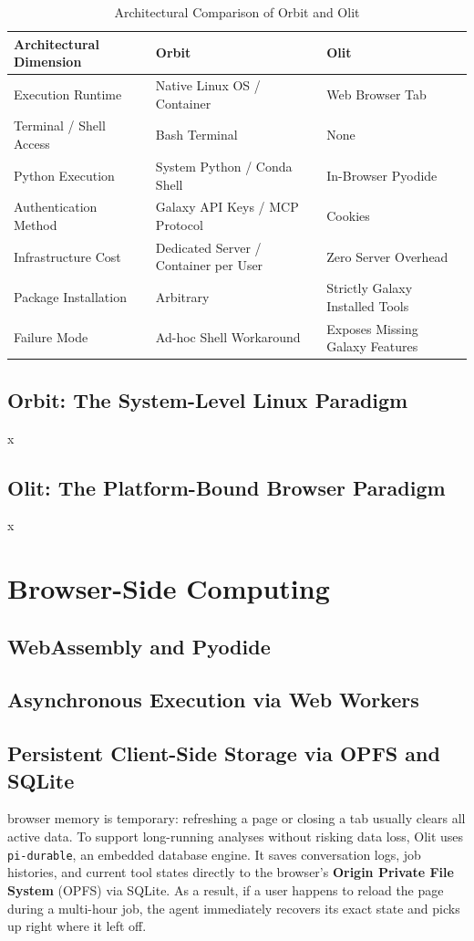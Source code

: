 \begin{table}[htbp]
\centering
\caption{Architectural Comparison of Orbit and Olit}
\label{tab:orbit_vs_olit}
\begin{tabular}{@{}lll@{}}
\toprule
\textbf{Architectural Dimension} & \textbf{Orbit} & \textbf{Olit} \\ \midrule
Execution Runtime & Native Linux OS / Container & Web Browser Tab \\
Terminal / Shell Access & Bash Terminal & None \\
Python Execution & System Python / Conda Shell & In-Browser Pyodide \\
Authentication Method & Galaxy API Keys / MCP Protocol & Cookies \\
Infrastructure Cost & Dedicated Server / Container per User & Zero Server Overhead \\
Package Installation & Arbitrary & Strictly Galaxy Installed Tools \\
Failure Mode & Ad-hoc Shell Workaround & Exposes Missing Galaxy Features \\ \bottomrule
\end{tabular}
\end{table}

\subsection{Orbit: The System-Level Linux Paradigm}
x

\subsection{Olit: The Platform-Bound Browser Paradigm}
x

\section{Browser-Side Computing}
\label{sec:browser_computing}

\subsection{WebAssembly and Pyodide}

\subsection{Asynchronous Execution via Web Workers}

\subsection{Persistent Client-Side Storage via OPFS and SQLite}
browser memory is temporary: refreshing a page or closing a tab usually clears all active data. To support long-running analyses without risking data loss, Olit uses \texttt{pi-durable}, an embedded database engine. It saves conversation logs, job histories, and current tool states directly to the browser's \textbf{Origin Private File System} (OPFS) via SQLite. As a result, if a user happens to reload the page during a multi-hour job, the agent immediately recovers its exact state and picks up right where it left off.


